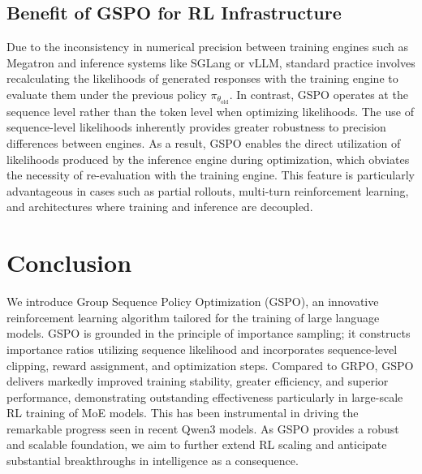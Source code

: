 \subsection{Benefit of GSPO for RL Infrastructure}

Due to the inconsistency in numerical precision between training engines such as Megatron and inference systems like SGLang or vLLM, standard practice involves recalculating the likelihoods of generated responses with the training engine to evaluate them under the previous policy $\pi_{\theta_\text{old}}$. In contrast, GSPO operates at the sequence level rather than the token level when optimizing likelihoods. The use of sequence-level likelihoods inherently provides greater robustness to precision differences between engines. As a result, GSPO enables the direct utilization of likelihoods produced by the inference engine during optimization, which obviates the necessity of re-evaluation with the training engine. This feature is particularly advantageous in cases such as partial rollouts, multi-turn reinforcement learning, and architectures where training and inference are decoupled.

\section{Conclusion}

We introduce Group Sequence Policy Optimization (GSPO), an innovative reinforcement learning algorithm tailored for the training of large language models. GSPO is grounded in the principle of importance sampling; it constructs importance ratios utilizing sequence likelihood and incorporates sequence-level clipping, reward assignment, and optimization steps. Compared to GRPO, GSPO delivers markedly improved training stability, greater efficiency, and superior performance, demonstrating outstanding effectiveness particularly in large-scale RL training of MoE models. This has been instrumental in driving the remarkable progress seen in recent Qwen3 models. As GSPO provides a robust and scalable foundation, we aim to further extend RL scaling and anticipate substantial breakthroughs in intelligence as a consequence.

